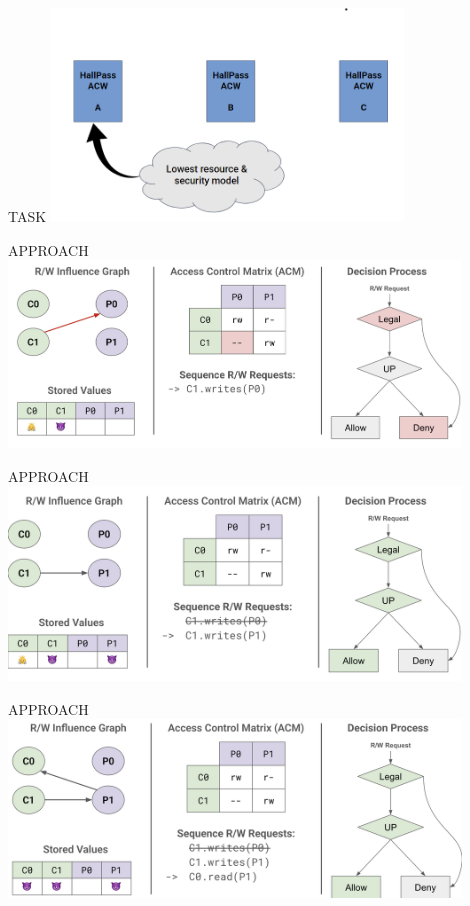 \begin{frame}{TASK}
    \centering
    \includegraphics[height=0.7\textheight,width=0.7\textwidth,keepaspectratio]{models.png}
\end{frame}

\begin{frame}{APPROACH}
    \centering
    \includegraphics[height=0.9\textheight,width=0.9\textwidth,keepaspectratio]{slide 1.png}
\end{frame}

\begin{frame}{APPROACH}
    \centering
    \includegraphics[height=0.9\textheight,width=0.9\textwidth,keepaspectratio]{slide 2.png}
\end{frame}

\begin{frame}{APPROACH}
    \centering
    \includegraphics[height=0.9\textheight,width=0.9\textwidth,keepaspectratio]{slide 3.png}
\end{frame}


